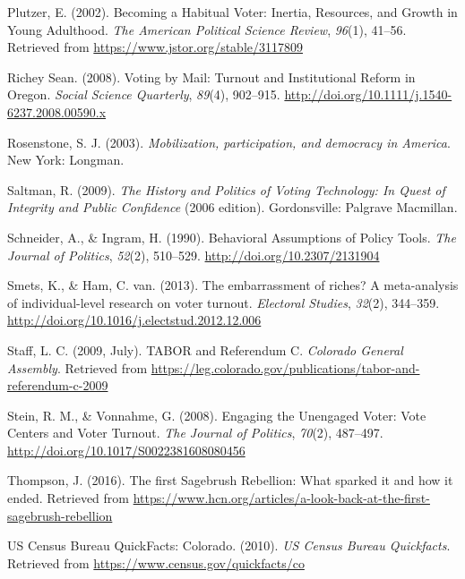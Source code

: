 \documentclass[12pt,twoside]{reedthesis}
\begin{document}
  \hypertarget{ref-plutzer_becoming_2002}{}
  Plutzer, E. (2002). Becoming a Habitual Voter: Inertia, Resources, and
  Growth in Young Adulthood. \emph{The American Political Science Review},
  \emph{96}(1), 41--56. Retrieved from
  \url{https://www.jstor.org/stable/3117809}
  
  \hypertarget{ref-richey_sean_voting_2008}{}
  Richey Sean. (2008). Voting by Mail: Turnout and Institutional Reform in
  Oregon. \emph{Social Science Quarterly}, \emph{89}(4), 902--915.
  \url{http://doi.org/10.1111/j.1540-6237.2008.00590.x}
  
  \hypertarget{ref-rosenstone_mobilization_2003}{}
  Rosenstone, S. J. (2003). \emph{Mobilization, participation, and
  democracy in America}. New York: Longman.
  
  \hypertarget{ref-saltman_history_2009}{}
  Saltman, R. (2009). \emph{The History and Politics of Voting Technology:
  In Quest of Integrity and Public Confidence} (2006 edition).
  Gordonsville: Palgrave Macmillan.
  
  \hypertarget{ref-schneider_behavioral_1990}{}
  Schneider, A., \& Ingram, H. (1990). Behavioral Assumptions of Policy
  Tools. \emph{The Journal of Politics}, \emph{52}(2), 510--529.
  \url{http://doi.org/10.2307/2131904}
  
  \hypertarget{ref-smets_embarrassment_2013}{}
  Smets, K., \& Ham, C. van. (2013). The embarrassment of riches? A
  meta-analysis of individual-level research on voter turnout.
  \emph{Electoral Studies}, \emph{32}(2), 344--359.
  \url{http://doi.org/10.1016/j.electstud.2012.12.006}
  
  \hypertarget{ref-legislative_council_staff_tabor_2009}{}
  Staff, L. C. (2009, July). TABOR and Referendum C. \emph{Colorado
  General Assembly}. Retrieved from
  \url{https://leg.colorado.gov/publications/tabor-and-referendum-c-2009}
  
  \hypertarget{ref-stein_engaging_2008}{}
  Stein, R. M., \& Vonnahme, G. (2008). Engaging the Unengaged Voter: Vote
  Centers and Voter Turnout. \emph{The Journal of Politics}, \emph{70}(2),
  487--497. \url{http://doi.org/10.1017/S0022381608080456}
  
  \hypertarget{ref-thompson_first_2016}{}
  Thompson, J. (2016). The first Sagebrush Rebellion: What sparked it and
  how it ended. Retrieved from
  \url{https://www.hcn.org/articles/a-look-back-at-the-first-sagebrush-rebellion}
  
  \hypertarget{ref-us_census_bureau_us_2010}{}
  US Census Bureau QuickFacts: Colorado. (2010). \emph{US Census Bureau
  Quickfacts}. Retrieved from \url{https://www.census.gov/quickfacts/co}
  
\end{document}
